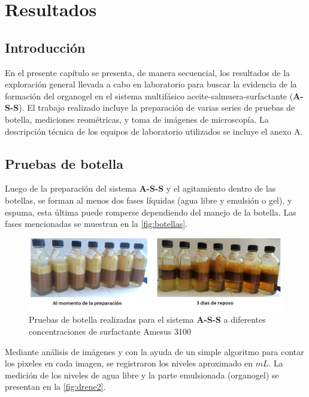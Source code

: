 \chapter{Resultados}
\label{chp:resultados}

\section{Introducción}

En el presente capítulo se presenta, de manera secuencial, los resultados de la exploración general llevada a cabo en laboratorio para buscar la evidencia de la formación del organogel en el sistema multifásico aceite-salmuera-surfactante (\textbf{A-S-S}). El trabajo realizado incluye la preparación de varias series de pruebas de botella, mediciones reométricas, y toma de imágenes de microscopía. La descripción técnica de los equipos de laboratorio utilizados se incluye el anexo A.

\section{Pruebas de botella}

Luego de la preparación del sistema \textbf{A-S-S} y el agitamiento dentro de las botellas, se forman al menos dos fases líquidas (agua libre y  emulsión o gel), y espuma, esta última puede romperse dependiendo del manejo de la botella. Las fases mencionadas se muestran en la \autoref{fig:botellas}.

\begin{figure}\centering
    \includegraphics[width=1.0\textwidth]{Experimental/Botellas_2.png}
    \caption[Fases formadas en botellas]{Pruebas de botella realizadas para el sistema \textbf{A-S-S} a diferentes concentraciones de surfactante Amesus 3100}
    \label{fig:botellas}
\end{figure}

Mediante análisis de imágenes y con la ayuda de un simple algoritmo para contar los pixeles en cada imagen, se registraron los niveles aproximado en $mL$. La medición de los niveles de agua libre y la parte emulsionada (organogel) se presentan en la \autoref{fig:drene2}. 

